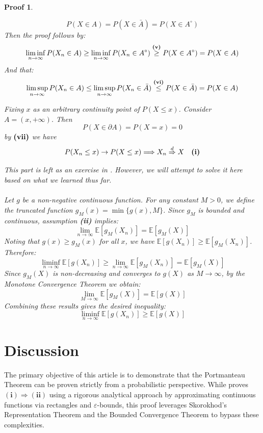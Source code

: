 \documentclass[11pt]{article}
\newtheorem*{Proof}{Proof}
\begin{document}
\begin{Proof}
\begin{description}[style=nextline,leftmargin=!,labelwidth=4cm]
  $$
  P(X \in A) = P(X \in \bar{A}) = P(X \in A^\circ)
  $$
  Then the proof follows by: 
  $$
  \liminf_{n\to \infty} P (X_n \in A) \ge \liminf_{n\to \infty} P(X_n \in A^\circ) \overset{\textnormal{\textbf{(v)}}}{\ge} P(X \in A^\circ) = P(X\in A) 
  $$
  And that:
  $$
  \limsup_{n\to \infty} P(X_n \in A) \le \limsup_{n\to \infty} P(X_n \in \bar{A}) \overset{\textnormal{\textbf{(vi)}}}{\le} P(X \in \bar{A}) = P(X \in A)
  $$
  \item[(vii)$\Rightarrow$(i)] Fixing $x$ as an arbitrary continuity point of $P(X \le x)$. Consider $A = (x, +\infty)$. Then $$P(X \in \partial A) = P(X=x) = 0$$
  by $\textnormal{\textbf{(vii)}}$ we have
  $$
  P(X_n \le x)  \rightarrow P(X \le x) \Longrightarrow X_n \overset{d}{\Rightarrow} X \quad \textnormal{\textbf{(i)}}
  $$
  \item[(ii)$\Leftrightarrow$(iv)] This part is left as an exercise in \citet{vanderVaart1998}. However, we will attempt to solve it here based on what we learned thus far.
  \\
  \\
Let $g$ be a non-negative continuous function. For any constant $M > 0$, we define the truncated function $g_M(x) = \min\{g(x), M\}$. Since $g_M$ is bounded and continuous, assumption \textnormal{\textbf{(ii)}} implies:
$$
\lim_{n\to\infty}\mathbb{E}[g_M(X_n)] = \mathbb{E}[g_M(X)]
$$
Noting that $g(x) \ge g_M(x)$ for all $x$, we have $\mathbb{E}[g(X_n)] \ge \mathbb{E}[g_M(X_n)]$. Therefore:
$$
\liminf_{n\to\infty}\mathbb{E}[g(X_n)] \ge \lim_{n\to\infty}\mathbb{E}[g_M(X_n)] = \mathbb{E}[g_M(X)]
$$
Since $g_M(X)$ is non-decreasing and converges to $g(X)$ as $M \to \infty$, by the Monotone Convergence Theorem we obtain:
$$
\lim_{M \to \infty} \mathbb{E}[g_M(X)] = \mathbb{E}[g(X)]
$$
Combining these results gives the desired inequality:
$$
\liminf_{n\to\infty}\mathbb{E}[g(X_n)] \ge \mathbb{E}[g(X)]
$$
\end{description}
\end{Proof}

\section{Discussion}
The primary objective of this article is to demonstrate that the Portmanteau Theorem can be proven strictly from a probabilistic perspective. While \citet{vanderVaart1998} proves $\mathbf{(i)}\Rightarrow\mathbf{(ii)}$ using a rigorous analytical approach by approximating continuous functions via rectangles and $\varepsilon$-bounds, this proof leverages Skorokhod’s Representation Theorem and the Bounded Convergence Theorem to bypass these complexities.
\end{document}

